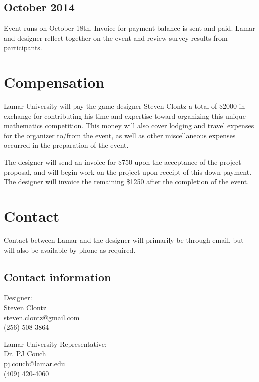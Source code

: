 \documentclass[11pt,letterpaper]{article}
\begin{document}
\subsection{October 2014}

Event runs on October 18th. Invoice for payment balance is sent
and paid. Lamar and designer reflect together on the event
and review survey results from participants.



\newpage

\section{Compensation}

Lamar University will pay the game designer Steven Clontz a total of \$2000 
in exchange for contributing his time and expertise toward organizing
this unique mathematics competition. This money will also cover lodging and 
travel expenses for the organizer to/from the event, as well as other 
miscellaneous expenses occurred in the preparation of the event.

The designer will send an invoice for \$750 upon the acceptance of the
project proposal, and will begin work on the project upon receipt of this
down payment. The designer will invoice the remaining \$1250 after the
completion of the event.

\section{Contact} 

Contact between Lamar and the designer will primarily be through email, but
will also be available by phone as required.

\subsection{Contact information} 

\noindent Designer: \\
Steven Clontz \\
steven.clontz@gmail.com \\
(256) 508-3864

\noindent Lamar University Representative: \\
Dr. PJ Couch \\
pj.couch@lamar.edu \\
(409) 420-4060
\end{document}
